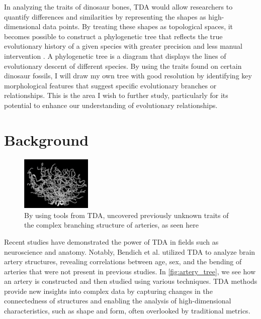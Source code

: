 \documentclass[12pt]{article}
\begin{document}
In analyzing the traits of dinosaur bones, TDA would allow researchers to quantify
differences and similarities by representing the shapes as high-dimensional data
points. By treating these shapes as topological spaces, it becomes possible to
construct a phylogenetic tree that reflects the true evolutionary history of a
given species with greater precision and less manual intervention \citep{yang2012}.
A phylogenetic tree is a diagram that displays the lines of evolutionary descent
of different species. By using the traits found on certain dinosaur fossils, I
will draw my own tree with good resolution by identifying key morphological 
features that suggest specific evolutionary branches or relationships. This is 
the area I wish to further study, particularly for its potential to enhance our 
understanding of evolutionary relationships. 

\section{Background}
\begin{figure}
	\centering
	\includegraphics[width=0.3\textwidth]{arteryTree.png}
	\caption{By using tools from TDA, \cite{bendich2016} uncovered previously
unknown traits of the complex branching structure of arteries, as seen here}
	\label{fig:artery_tree}
\end{figure}
Recent studies have demonstrated the power of TDA in fields such as neuroscience
and anatomy. Notably, Bendich et al. \cite{bendich2016} utilized 
TDA to analyze brain artery structures, revealing correlations between age, sex, 
and the bending of arteries that were not present in previous studies. In
\autoref{fig:artery_tree}, we see how an artery is constructed and then studied 
using various techniques. TDA methods provide new insights into complex 
data by capturing changes in the connectedness of structures and enabling the 
analysis of high-dimensional characteristics, such as shape and form, often 
overlooked by traditional metrics. 

\end{document}
